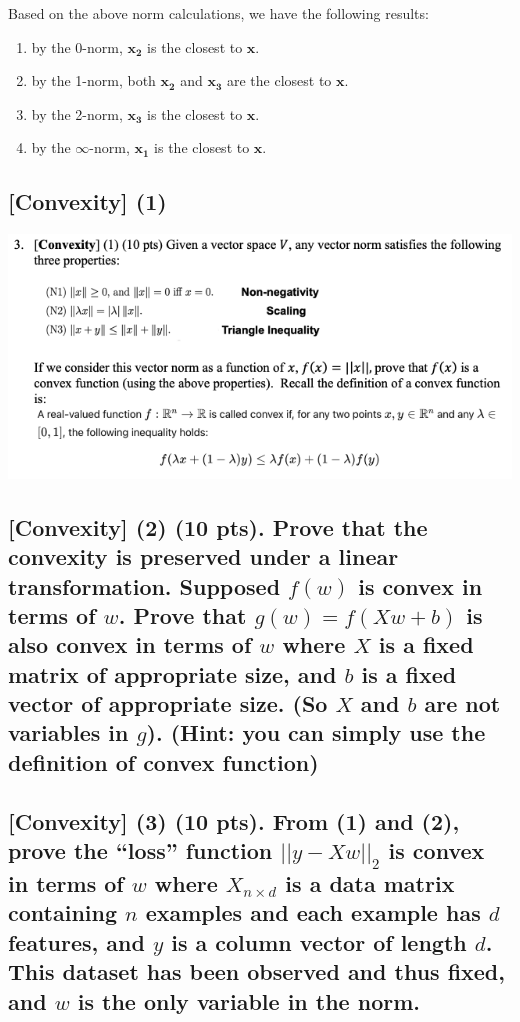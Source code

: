 Based on the above norm calculations, we have the following results:
\begin{enumerate}
    \item by the 0-norm, $\mathbf{x_2}$ is the closest to $\mathbf{x}$.
    \item by the 1-norm, both $\mathbf{x_2}$ and $\mathbf{x_3}$ are the closest to $\mathbf{x}$.
    \item by the 2-norm, $\mathbf{x_3}$ is the closest to $\mathbf{x}$.
    \item by the $\infty$-norm, $\mathbf{x_1}$ is the closest to $\mathbf{x}$.
\end{enumerate}

\subsection{[Convexity] (1)}

\includegraphics[width=1\textwidth]{media/hw2_q3.png}

\subsection{[Convexity] (2) (10 pts). Prove that the convexity is preserved under a linear transformation. Supposed $f(w)$ is convex in terms of $w$. Prove that $g(w)=f(X w + b)$ is also convex in terms of $w$ where $X$ is a fixed matrix of appropriate size, and $b$ is a fixed vector of appropriate size. (So $X$ and $b$ are not variables in $g$). (Hint: you can simply use the definition of convex function)}

\subsection{[Convexity] (3) (10 pts). From (1) and (2), prove the “loss” function $||y-Xw||_2$ is convex in terms of $w$ where $X_{n \times d}$ is a data matrix containing $n$ examples and each example has $d$ features, and $y$ is a column vector of length $d$. This dataset has been observed and thus fixed, and $w$ is the only variable in the norm.}